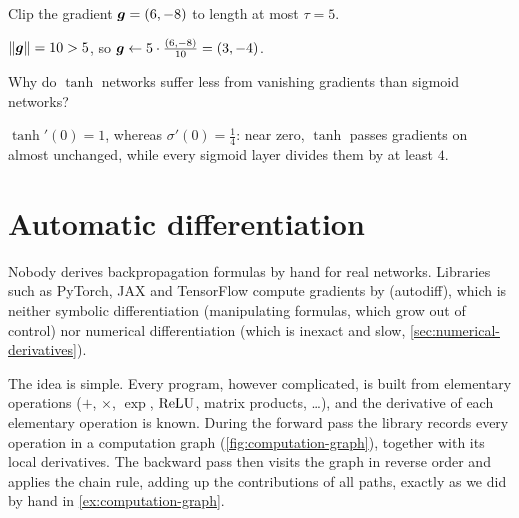 \begin{exercise}
Clip the gradient $\bm{g} = (6, -8)$ to length at most $\tau = 5$.
\end{exercise}
\begin{solution}
$\lVert\bm{g}\rVert = 10 > 5$, so $\bm{g} \leftarrow 5\cdot\tfrac{(6, -8)}{10} = (3, -4)$.
\end{solution}

\begin{exercise}
Why do $\tanh$ networks suffer less from vanishing gradients than sigmoid networks?
\end{exercise}
\begin{solution}
$\tanh'(0) = 1$, whereas $\sigma'(0) = \tfrac14$: near zero, $\tanh$ passes gradients
on almost unchanged, while every sigmoid layer divides them by at least $4$.
\end{solution}

\section{Automatic differentiation}\label{sec:autodiff}

Nobody derives backpropagation formulas by hand for real networks. Libraries
such as PyTorch, JAX and TensorFlow compute gradients by  (autodiff), which is neither symbolic differentiation
(manipulating formulas, which grow out of control) nor numerical differentiation
(which is inexact and slow, \cref{sec:numerical-derivatives}).

The idea is simple. Every program, however complicated, is built from elementary
operations ($+$, $\times$, $\exp$, $\operatorname{ReLU}$, matrix products, \dots), and the
derivative of each elementary operation is known. During the forward pass the
library records every operation in a computation graph (\cref{fig:computation-graph}),
together with its local derivatives. The backward pass then visits the graph in
reverse order and applies the chain rule, adding up the contributions of all
paths, exactly as we did by hand in \cref{ex:computation-graph}.

